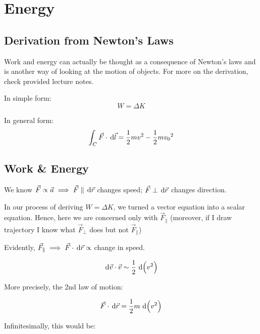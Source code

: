\chapter{Energy}

\section{Derivation from Newton's Laws}

Work and energy can actually be thought as a consequence of Newton's laws and is another way of looking at the motion of objects. For more on the derivation, check provided lecture notes.

\begin{theorem}
	In simple form:
	\begin{equation}
		W = \Delta K
	\end{equation}

	In general form:
	\begin{equation}
		\int_C \vec F \cdot \D \vec l = \frac{1}{2}mv^2 - \frac{1}{2}m{v_0}^2
	\end{equation}
\end{theorem}

\section{Work \& Energy}

We know $\vec F \propto \vec a \implies \vec F \parallel \D \vec r$ changes speed; $\vec F \perp \D \vec r$ changes direction.

In our process of deriving $W = \Delta K$, we turned a vector equation into a scalar equation. Hence, here we are concerned only with $\vec F_\parallel$ (moreover, if I draw trajectory I know what $\vec F_\perp$ does but not $\vec F_\parallel$)

Evidently, $\vec F_\parallel \implies \vec F \cdot \D \vec r \propto$ change in speed.

\begin{equation}
	\D \vec v \cdot \vec v \sim \frac{1}{2}\D(v^2)
\end{equation}

More precisely, the 2nd law of motion:

\begin{equation}
	\vec F \cdot \D \vec r = \frac{1}{2} m \D(v^2)
\end{equation}

Infinitesimally, this would be:

